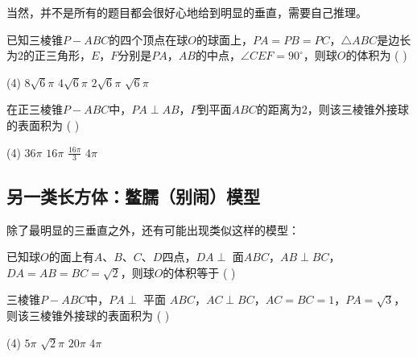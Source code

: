 当然，并不是所有的题目都会很好心地给到明显的垂直，需要自己推理。

\vspace{0.5em}

\begin{example}
    已知三棱锥$P-ABC$的四个顶点在球$O$的球面上，$PA=PB=PC$，$\triangle ABC$是边长为$2$的正三角形，$E$，$F$分别是$PA$，$AB$的中点，$\angle CEF=90^\circ$，则球$O$的体积为 ( \hspace{1.5cm} )
    \begin{tasks}(4)
        \task $8\sqrt{6}\pi$
        \task $4\sqrt{6}\pi$
        \task $2\sqrt{6}\pi$
        \task $\sqrt{6}\pi$
    \end{tasks}
\end{example}

\begin{example}
    在正三棱锥$P-ABC$中，$PA \perp AB$，$P$到平面$ABC$的距离为$2$，则该三棱锥外接球的表面积为 ( \hspace{1.5cm} )
    \begin{tasks}(4)
        \task $36\pi$
        \task $16\pi$
        \task $\frac{16\pi}{3}$
        \task $4\pi$
    \end{tasks}
\end{example}

\subsection{另一类长方体：鳖臑（别闹）模型}

除了最明显的三垂直之外，还有可能出现类似这样的模型：

\begin{figure} [H]
    \centering
    \resizebox{0.3\textwidth}{!}{}
\end{figure}


\begin{example}
    已知球$O$的面上有$A$、$B$、$C$、$D$四点，$DA \perp$ 面$ABC$，$AB \perp BC$，$DA = AB = BC = \sqrt{2}$，则球$O$的体积等于 ( \hspace{1.5cm} )
\end{example}

\vspace{8em}

\begin{example}
    三棱锥$P-ABC$中，$PA \perp$ 平面 $ABC$，$AC \perp BC$，$AC = BC = 1$，$PA = \sqrt{3}$，则该三棱锥外接球的表面积为 ( \hspace{1.5cm} )
    \begin{tasks}(4)
        \task $5\pi$
        \task $\sqrt{2}\pi$
        \task $20\pi$
        \task $4\pi$
    \end{tasks}
\end{example}

